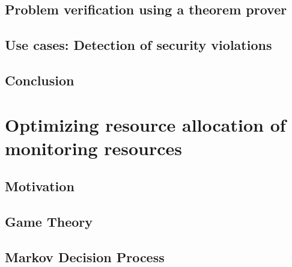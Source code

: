 \documentclass[a4paper, 11pt]{article}
\begin{document}
\subsection{Problem verification using a theorem prover}


\subsection{Use cases: Detection of security violations}


\newpage
\subsection{Conclusion}


\newpage
\section{Optimizing resource allocation of monitoring resources}
\label{sec:RAprob}
\subsection{Motivation}


\newpage
\subsection{Game Theory}


\newpage
\subsection{Markov Decision Process}


\newpage

\newpage
{}


\newpage
\begin{appendices}

\newpage
% 
\newpage

\end{appendices}
\end{document}
